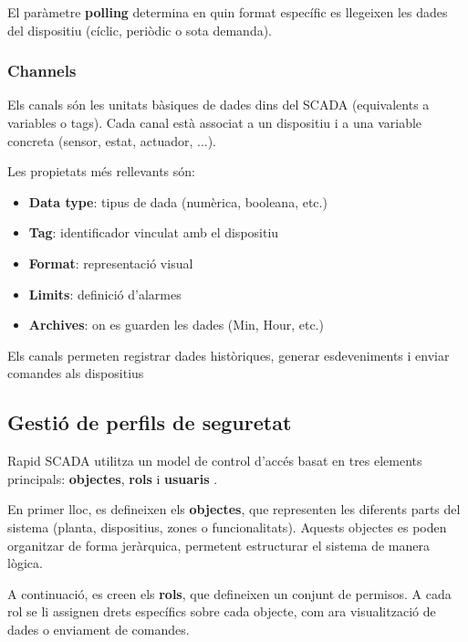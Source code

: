 \documentclass[a4paper,11pt,DIV=13,headings=normal,abstract=true,twoside=semi]{article}
\begin{document}
El paràmetre \textbf{polling} determina en quin format específic es llegeixen les dades del dispositiu (cíclic, periòdic o sota demanda).

\subsubsection*{Channels}

Els canals són les unitats bàsiques de dades dins del SCADA (equivalents a variables o tags). Cada canal està associat a un dispositiu i a una variable concreta (sensor, estat, actuador, ...).

Les propietats més rellevants són:

\begin{itemize}
    \item \textbf{Data type}: tipus de dada (numèrica, booleana, etc.)
    \item \textbf{Tag}: identificador vinculat amb el dispositiu
    \item \textbf{Format}: representació visual
    \item \textbf{Limits}: definició d'alarmes
    \item \textbf{Archives}: on es guarden les dades (Min, Hour, etc.)
\end{itemize}

Els canals permeten registrar dades històriques, generar esdeveniments i enviar comandes als dispositius

\subsection{Gestió de perfils de seguretat}
\label{sec:scada_users}


Rapid SCADA utilitza un model de control d'accés basat en tres elements principals: \textbf{objectes}, \textbf{rols} i \textbf{usuaris} \cite{rapidscada_user_management}.

En primer lloc, es defineixen els \textbf{objectes}, que representen les diferents parts del sistema (planta, dispositius, zones o funcionalitats). Aquests objectes es poden organitzar de forma jeràrquica, permetent estructurar el sistema de manera lògica.

A continuació, es creen els \textbf{rols}, que defineixen un conjunt de permisos. A cada rol se li assignen drets específics sobre cada objecte, com ara visualització de dades o enviament de comandes.
\end{document}
